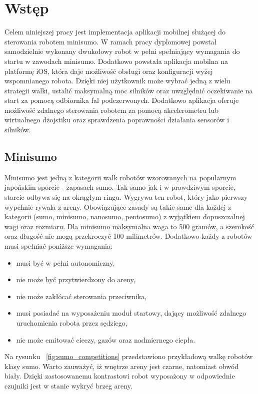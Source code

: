 \chapter{Wstęp}
Celem niniejszej pracy jest implementacja aplikacji mobilnej służącej do sterowania robotem minisumo. W ramach pracy dyplomowej powstał samodzielnie wykonany dwukołowy robot w pełni spełniający wymagania do startu w zawodach minisumo. Dodatkowo powstała aplikacja mobilna na platformę iOS, która daje możliwość obsługi oraz konfiguracji wyżej wspomnianego robota. Dzięki niej użytkownik może wybrać jedną z wielu strategii walki, ustalić maksymalną moc silników oraz uwzględnić oczekiwanie na start za pomocą odbiornika fal podczerwonych. Dodatkowo aplikacja oferuje możliwość zdalnego sterowania robotem za pomocą akcelerometru lub wirtualnego dżojstiku oraz sprawdzenia poprawności działania sensorów i silników. 

\section{Minisumo}
Minisumo jest jedną z kategorii walk robotów wzorowanych na popularnym japońskim sporcie - zapasach sumo. Tak samo jak i w prawdziwym sporcie, starcie odbywa się na okrągłym ringu. Wygrywa ten robot, który jako pierwszy wypchnie rywala z areny. Obowiązujące zasady są takie same dla każdej z kategorii (sumo, minisumo, nanosumo, pentosumo) z wyjątkiem dopuszczalnej wagi oraz rozmiaru. Dla minisumo maksymalna waga to 500 gramów, a szerokość oraz długość nie mogą przekroczyć 100 milimetrów. Dodatkowo każdy z robotów musi spełniać 
poniższe wymagania:
\begin{itemize}
\item musi być w pełni autonomiczny,
\item nie może być przytwierdzony do areny,
\item nie może zakłócać sterowania przeciwnika,
\item musi posiadać na wyposażeniu moduł startowy, dający możliwość zdalnego uruchomienia robota przez sędziego,
\item nie może emitować cieczy, gazów oraz nadmiernego ciepła.
\end{itemize}

Na rysunku ~\ref{fig:sumo_competitions} przedstawiono przykładową walkę robotów klasy sumo. Warto zauważyć, iż  wnętrze areny jest czarne, natomiast obwód biały. Dzięki zastosowanemu kontrastowi robot wyposażony w odpowiednie czujniki jest w stanie wykryć brzeg areny.

